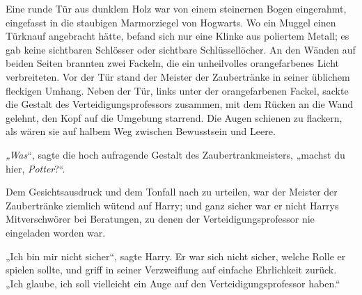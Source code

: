 Eine runde Tür aus dunklem Holz war von einem steinernen Bogen eingerahmt, eingefasst in die staubigen Marmorziegel von Hogwarts. Wo ein Muggel einen Türknauf angebracht hätte, befand sich nur eine Klinke aus poliertem Metall; es gab keine sichtbaren Schlösser oder sichtbare Schlüssellöcher. An den Wänden auf beiden Seiten brannten zwei Fackeln, die ein unheilvolles orangefarbenes Licht verbreiteten. Vor der Tür stand der Meister der Zaubertränke in seiner üblichem fleckigen Umhang. Neben der Tür, links unter der orangefarbenen Fackel, sackte die Gestalt des Verteidigungsprofessors zusammen, mit dem Rücken an die Wand gelehnt, den Kopf auf die Umgebung starrend. Die Augen schienen zu flackern, als wären sie auf halbem Weg zwischen Bewusstsein und Leere.

\emph{„Was}“, sagte die hoch aufragende Gestalt des Zaubertrankmeisters, „machst du hier, \emph{Potter}?“.

Dem Gesichtsausdruck und dem Tonfall nach zu urteilen, war der Meister der Zaubertränke ziemlich wütend auf Harry; und ganz sicher war er nicht Harrys Mitverschwörer bei Beratungen, zu denen der Verteidigungsprofessor nie eingeladen worden war.

„Ich bin mir nicht sicher“, sagte Harry.
Er war sich nicht sicher, welche Rolle er spielen sollte, und griff in seiner Verzweiflung auf einfache Ehrlichkeit zurück.
„Ich glaube, ich soll vielleicht ein Auge auf den Verteidigungsprofessor haben.“

